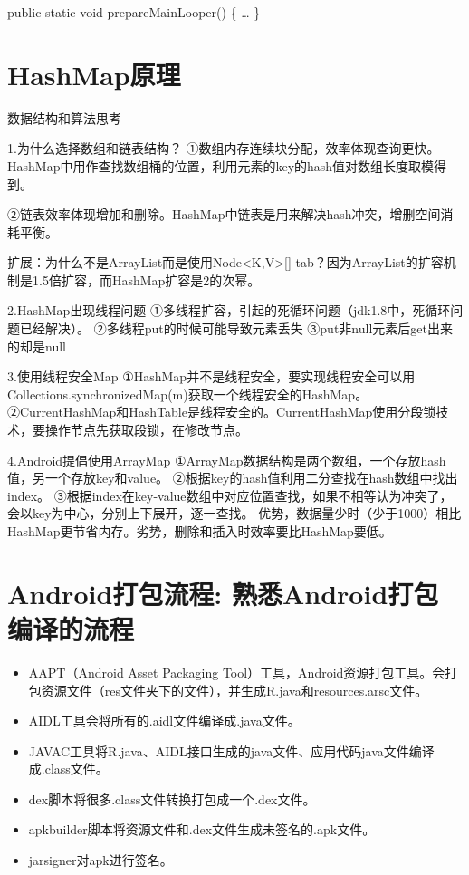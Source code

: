 \documentclass[9pt, b5paper]{article}
\begin{document}
public static void prepareMainLooper() \{ \ldots{} \}

\section{HashMap原理}
\label{sec-11}
数据结构和算法思考

1.为什么选择数组和链表结构？
①数组内存连续块分配，效率体现查询更快。HashMap中用作查找数组桶的位置，利用元素的key的hash值对数组长度取模得到。

②链表效率体现增加和删除。HashMap中链表是用来解决hash冲突，增删空间消耗平衡。

扩展：为什么不是ArrayList而是使用Node<K,V>[] tab？因为ArrayList的扩容机制是1.5倍扩容，而HashMap扩容是2的次幂。

2.HashMap出现线程问题
①多线程扩容，引起的死循环问题（jdk1.8中，死循环问题已经解决）。
②多线程put的时候可能导致元素丢失
③put非null元素后get出来的却是null

3.使用线程安全Map
①HashMap并不是线程安全，要实现线程安全可以用Collections.synchronizedMap(m)获取一个线程安全的HashMap。
②CurrentHashMap和HashTable是线程安全的。CurrentHashMap使用分段锁技术，要操作节点先获取段锁，在修改节点。

4.Android提倡使用ArrayMap
①ArrayMap数据结构是两个数组，一个存放hash值，另一个存放key和value。
②根据key的hash值利用二分查找在hash数组中找出index。
③根据index在key-value数组中对应位置查找，如果不相等认为冲突了，会以key为中心，分别上下展开，逐一查找。
优势，数据量少时（少于1000）相比HashMap更节省内存。劣势，删除和插入时效率要比HashMap要低。

\section{Android打包流程: 熟悉Android打包编译的流程}
\label{sec-12}
\begin{itemize}
\item AAPT（Android Asset Packaging Tool）工具，Android资源打包工具。会打包资源文件（res文件夹下的文件），并生成R.java和resources.arsc文件。
\item AIDL工具会将所有的.aidl文件编译成.java文件。
\item JAVAC工具将R.java、AIDL接口生成的java文件、应用代码java文件编译成.class文件。
\item dex脚本将很多.class文件转换打包成一个.dex文件。
\item apkbuilder脚本将资源文件和.dex文件生成未签名的.apk文件。
\item jarsigner对apk进行签名。
\end{itemize}
\end{document}
